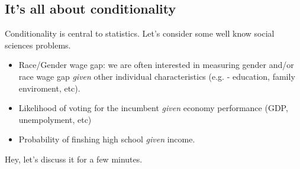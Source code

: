 \documentclass[11pt]{article}
\begin{document}
	\subsection*{It's all about conditionality}

 	Conditionality is central to statistics. Let's consider some well know social sciences problems.

	\begin{itemize}
		\item	Race/Gender wage gap: we are often interested in measuring gender and/or race wage gap \emph{given} other individual characteristics (e.g. - education, family enviroment, etc).
		\item Likelihood of voting for the incumbent \emph{given} economy performance (GDP, unempolyment, etc)
		\item Probability of finshing high school \emph{given} income.
		\end{itemize}

Hey, let's discuss it for a few minutes.
\end{document}
